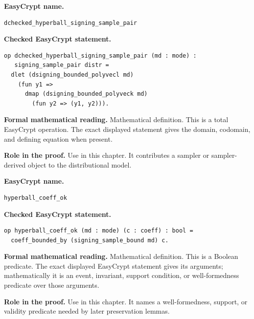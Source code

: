 \begin{formaldefinition}
\noindent\textbf{EasyCrypt name.}
\begin{lstlisting}[language=EasyCrypt,basicstyle=\ttfamily\scriptsize]
dchecked_hyperball_signing_sample_pair
\end{lstlisting}
\noindent\textbf{Checked EasyCrypt statement.}
\begin{lstlisting}[language=EasyCrypt,basicstyle=\ttfamily\scriptsize]
op dchecked_hyperball_signing_sample_pair (md : mode) :
   signing_sample_pair distr =
  dlet (dsigning_bounded_polyvecl md)
    (fun y1 =>
      dmap (dsigning_bounded_polyveck md)
        (fun y2 => (y1, y2))).
\end{lstlisting}
\noindent\textbf{Formal mathematical reading.}
Mathematical definition. This is a total EasyCrypt operation.  The exact displayed statement gives the domain, codomain, and defining equation when present.

\noindent\textbf{Role in the proof.}
Use in this chapter. It contributes a sampler or sampler-derived object to the distributional model.

\end{formaldefinition}

\begin{formaldefinition}
\noindent\textbf{EasyCrypt name.}
\begin{lstlisting}[language=EasyCrypt,basicstyle=\ttfamily\scriptsize]
hyperball_coeff_ok
\end{lstlisting}
\noindent\textbf{Checked EasyCrypt statement.}
\begin{lstlisting}[language=EasyCrypt,basicstyle=\ttfamily\scriptsize]
op hyperball_coeff_ok (md : mode) (c : coeff) : bool =
  coeff_bounded_by (signing_sample_bound md) c.
\end{lstlisting}
\noindent\textbf{Formal mathematical reading.}
Mathematical definition. This is a Boolean predicate.  The exact displayed EasyCrypt statement gives its arguments; mathematically it is an event, invariant, support condition, or well-formedness predicate over those arguments.

\noindent\textbf{Role in the proof.}
Use in this chapter. It names a well-formedness, support, or validity predicate needed by later preservation lemmas.

\end{formaldefinition}

